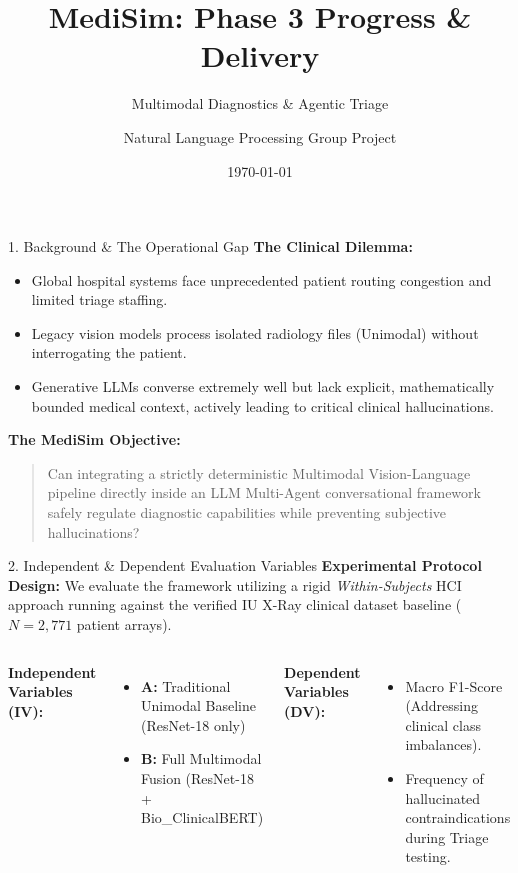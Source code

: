 \documentclass[aspectratio=169, 10pt]{beamer}
\title[MediSim Iteration]{MediSim: Phase 3 Progress \& Delivery}
\subtitle{Multimodal Diagnostics \& Agentic Triage}
\author[Phase 3 Team]{Natural Language Processing Group Project}
\institute[AIT]{Asian Institute of Technology}
\date{\today}
\begin{document}
\begin{frame}
    \titlepage
\end{frame}

\begin{frame}{1. Background \& The Operational Gap}
    \textbf{The Clinical Dilemma:}
    \begin{itemize}
        \item Global hospital systems face unprecedented patient routing congestion and limited triage staffing.
        \item Legacy vision models process isolated radiology files (Unimodal) without interrogating the patient.
        \item Generative LLMs converse extremely well but lack explicit, mathematically bounded medical context, actively leading to critical clinical hallucinations.
    \end{itemize}
    \vspace{0.5cm}
    \textbf{The MediSim Objective:}
    \begin{quote}
        Can integrating a strictly deterministic Multimodal Vision-Language pipeline directly inside an LLM Multi-Agent conversational framework safely regulate diagnostic capabilities while preventing subjective hallucinations?
    \end{quote}
\end{frame}

\begin{frame}{2. Independent \& Dependent Evaluation Variables}
    \textbf{Experimental Protocol Design:}
    We evaluate the framework utilizing a rigid \textit{Within-Subjects} HCI approach running against the verified IU X-Ray clinical dataset baseline ($N=2,771$ patient arrays). \\
    \vspace{0.4cm}
    \begin{columns}
        \textbf{Independent Variables (IV):}
        \begin{itemize}
            \item \textbf{A:} Traditional Unimodal Baseline (ResNet-18 only)
            \item \textbf{B:} Full Multimodal Fusion (ResNet-18 + Bio\_ClinicalBERT)
        \end{itemize}
        
        \textbf{Dependent Variables (DV):}
        \begin{itemize}
            \item Macro F1-Score (Addressing clinical class imbalances).
            \item Frequency of hallucinated contraindications during Triage testing.
        \end{itemize}
    \end{columns}
\end{frame}
\end{document}

